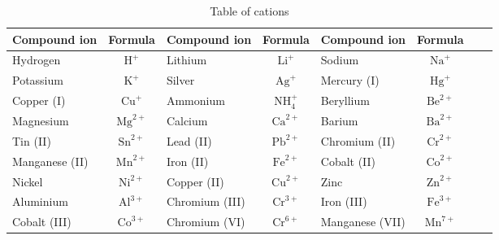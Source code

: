 \begin{enumerate}[noitemsep, label=\textbf{\arabic*}. ]
      
\begin{table}
\begin{center}
\label{tab:cations}
\begin{tabular}{|l|c|l|c|l|c|l|c|} \hline
\textbf{Compound ion} & \textbf{Formula} & \textbf{Compound ion} & \textbf{Formula} & \textbf{Compound ion} & \textbf{Formula}  \\ \hline
Hydrogen       & $\mathrm{H}^{+}$   & Lithium        & $\mathrm{Li}^{+}$     & Sodium          & $\mathrm{Na}^{+}$  \\ \hline
Potassium      & $\mathrm{K}^{+}$   & Silver         & $\mathrm{Ag}^{+}$     & Mercury (I)     & $\mathrm{Hg}^{+}$  \\ \hline
Copper (I)     & $\mathrm{Cu}^{+}$  & Ammonium       & $\mathrm{NH}_{4}^{+}$ & Beryllium       & $\mathrm{Be}^{2+}$ \\ \hline
Magnesium      & $\mathrm{Mg}^{2+}$ & Calcium        & $\mathrm{Ca}^{2+}$    & Barium          & $\mathrm{Ba}^{2+}$ \\ \hline
Tin (II)       & $\mathrm{Sn}^{2+}$ & Lead (II)      & $\mathrm{Pb}^{2+}$    & Chromium (II)   & $\mathrm{Cr}^{2+}$ \\ \hline
Manganese (II) & $\mathrm{Mn}^{2+}$ & Iron (II)      & $\mathrm{Fe}^{2+}$    & Cobalt (II)     & $\mathrm{Co}^{2+}$ \\ \hline
Nickel         & $\mathrm{Ni}^{2+}$ & Copper (II)    & $\mathrm{Cu}^{2+}$    & Zinc            & $\mathrm{Zn}^{2+}$ \\ \hline
Aluminium      & $\mathrm{Al}^{3+}$ & Chromium (III) & $\mathrm{Cr}^{3+}$    & Iron (III)      & $\mathrm{Fe}^{3+}$ \\ \hline
Cobalt (III)   & $\mathrm{Co}^{3+}$  & Chromium (VI)  & $\mathrm{Cr}^{6+}$    & Manganese (VII) & $\mathrm{Mn}^{7+}$ \\ \hline

\end{tabular}

 \end{center}
\caption{Table of cations}
\label{tab:cations}
\end{table}


\end{enumerate}
